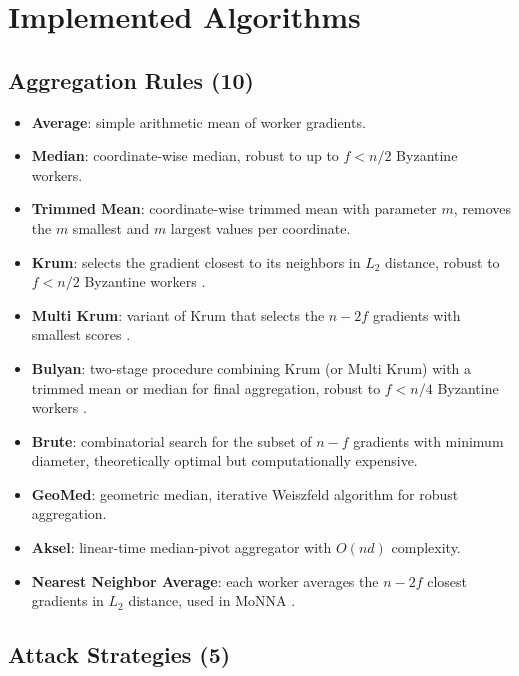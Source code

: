 \documentclass[twoside,11pt]{article}
\begin{document}
\appendix
\section{Implemented Algorithms}
\label{app:algorithms}

\subsection*{Aggregation Rules (10)}

\begin{itemize}
    \item \textbf{Average}: simple arithmetic mean of worker gradients.
    \item \textbf{Median}: coordinate-wise median, robust to up to $f < n/2$ Byzantine workers.
    \item \textbf{Trimmed Mean}: coordinate-wise trimmed mean with parameter $m$, removes the $m$ smallest and $m$ largest values per coordinate.
    \item \textbf{Krum}: selects the gradient closest to its neighbors in $L_2$ distance, robust to $f < n/2$ Byzantine workers \citep{blanchard2017machine}.
    \item \textbf{Multi Krum}: variant of Krum that selects the $n - 2f$ gradients with smallest scores \citep{blanchard2017machine}.
    \item \textbf{Bulyan}: two-stage procedure combining Krum (or Multi Krum) with a trimmed mean or median for final aggregation, robust to $f < n/4$ Byzantine workers \citep{elmhamdi2018hidden}.
    \item \textbf{Brute}: combinatorial search for the subset of $n - f$ gradients with minimum diameter, theoretically optimal but computationally expensive.
    \item \textbf{GeoMed}: geometric median, iterative Weiszfeld algorithm for robust aggregation.
    \item \textbf{Aksel}: linear-time median-pivot aggregator with $O(nd)$ complexity.
    \item \textbf{Nearest Neighbor Average}: each worker averages the $n - 2f$ closest gradients in $L_2$ distance, used in MoNNA \citep{farhadkhani2023monna}.
\end{itemize}

\subsection*{Attack Strategies (5)}
\end{document}
